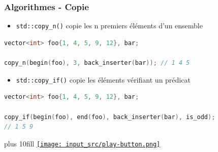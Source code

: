 \documentclass[C++.tex]{subfiles}
\begin{document}
\begin{frame}[fragile]
	\frametitle{Algorithmes - Copie}
	\begin{itemize}
		\item \lstinline|std::copy_n()| copie les n premiers éléments d'un ensemble
	\end{itemize}

	\begin{lstlisting}[language=C++]
vector<int> foo{1, 4, 5, 9, 12}, bar;

copy_n(begin(foo), 3, back_inserter(bar)); // 1 4 5\end{lstlisting}

	\begin{itemize}
		\item \lstinline|std::copy_if()| copie les éléments vérifiant un prédicat
	\end{itemize}

	\begin{lstlisting}[language=C++]
vector<int> foo{1, 4, 5, 9, 12}, bar;

copy_if(begin(foo), end(foo), back_inserter(bar), is_odd);
// 1 5 9\end{lstlisting}

	\vskip 10mm plus 10fill
	\hfill
	\href{https://godbolt.org/#g:!((g:!((g:!((h:codeEditor,i:(filename:'1',fontScale:14,fontUsePx:'0',j:1,lang:c%2B%2B,selection:(endColumn:1,endLineNumber:39,positionColumn:1,positionLineNumber:39,selectionStartColumn:1,selectionStartLineNumber:39,startColumn:1,startLineNumber:39),source:'%23include+%3Ciostream%3E%0A%23include+%3Cvector%3E%0A%23include+%3Calgorithm%3E%0A%0Ausing+std::begin%3B%0Ausing+std::end%3B%0A%0Astatic+bool+is_odd(int+i)%0A%7B%0A++return+(i%252)%3D%3D1%3B%0A%7D%0A%0Aint+main()%0A%7B%0A++std::vector%3Cint%3E+foo%7B1,+4,+5,+9,+12%7D%3B%0A%0A++%7B%0A++++std::vector%3Cint%3E+bar%3B%0A++++std::copy_n(begin(foo),+4,+std::back_inserter(bar))%3B%0A%0A++++for(size_t+i+%3D+0%3B+i+%3C+bar.size()%3B+%2B%2Bi)%0A++++%7B%0A++++++std::cout+%3C%3C+bar%5Bi%5D+%3C%3C+!'+!'%3B%0A++++%7D%0A++++std::cout+%3C%3C+!'%5Cn!'%3B%0A++%7D%0A%0A++%7B%0A++++std::vector%3Cint%3E+bar%3B%0A++++std::copy_if(begin(foo),+end(foo),+std::back_inserter(bar),+is_odd)%3B%0A%0A++++for(size_t+i+%3D+0%3B+i+%3C+bar.size()%3B+%2B%2Bi)%0A++++%7B%0A++++++std::cout+%3C%3C+bar%5Bi%5D+%3C%3C+!'+!'%3B%0A++++%7D%0A++++std::cout+%3C%3C+!'%5Cn!'%3B%0A++%7D%0A%7D%0A'),l:'5',n:'0',o:'C%2B%2B+source+%231',t:'0')),k:50,l:'4',n:'0',o:'',s:0,t:'0'),(g:!((h:executor,i:(argsPanelShown:'1',compilationPanelShown:'0',compiler:g112,compilerOutShown:'0',execArgs:'',execStdin:'',fontScale:14,fontUsePx:'0',j:1,lang:c%2B%2B,libs:!((name:boost,ver:'175')),options:'-std%3Dc%2B%2B11',source:1,stdinPanelShown:'1',tree:'1',wrap:'0'),l:'5',n:'0',o:'Executor+x86-64+gcc+11.2+(C%2B%2B,+Editor+%231)',t:'0')),header:(),k:50,l:'4',n:'0',o:'',s:0,t:'0')),l:'2',n:'0',o:'',t:'0')),version:4}{\texttt{[image: input\_src/play-button.png]}}
\end{frame}
\end{document}
